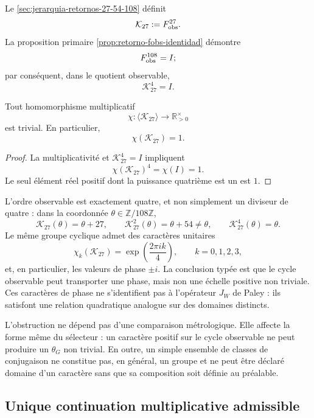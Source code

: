Le \cref{sec:jerarquia-retornos-27-54-108} définit
\[
 \mathcal K_{27}:=F_{\rm obs}^{27}.
\]
La proposition primaire \cref{prop:retorno-fobs-identidad} démontre
\[
 F_{\rm obs}^{108}=I;
\]
par conséquent, dans le quotient observable,
\[
 \mathcal K_{27}^{4}=I.
\]

\begin{theorem}
\label{thm:no-go-chi-G-observable}
Tout homomorphisme multiplicatif
\[
 \chi:\langle\mathcal K_{27}\rangle
 \longrightarrow\mathbb R_{>0}^{\times}
\]
est trivial. En particulier,
\[
 \chi(\mathcal K_{27})=1.
\]
\end{theorem}

\begin{proof}
La multiplicativité et \(\mathcal K_{27}^{4}=I\) impliquent
\[
 \chi(\mathcal K_{27})^4=\chi(I)=1.
\]
Le seul élément réel positif dont la puissance quatrième est un est \(1\).
\end{proof}

L'ordre observable est exactement quatre, et non simplement un diviseur de quatre :
dans la coordonnée \(\theta\in\mathbb Z/108\mathbb Z\),
\[
 \mathcal K_{27}(\theta)=\theta+27,
 \qquad
 \mathcal K_{27}^{2}(\theta)=\theta+54\neq\theta,
 \qquad
 \mathcal K_{27}^{4}(\theta)=\theta.
\]
Le même groupe cyclique admet des caractères unitaires
\[
 \chi_k(\mathcal K_{27})
 =\exp\!\left(\frac{2\pi i k}{4}\right),
 \qquad k=0,1,2,3,
\]
et, en particulier, les valeurs de phase \(\pm i\). La conclusion typée est
que le cycle observable peut transporter une phase, mais non une échelle positive
non triviale. Ces caractères de phase ne s'identifient pas à l'opérateur
\(J_W\) de Paley : ils satisfont une relation quadratique analogue sur des domaines
distincts.

L'obstruction ne dépend pas d'une comparaison métrologique. Elle affecte la forme
même du sélecteur : un caractère positif sur le cycle observable ne peut
produire un \(\theta_G\) non trivial. En outre, un simple ensemble de classes de
conjugaison ne constitue pas, en général, un groupe et ne peut être déclaré domaine
d'un caractère sans que sa composition soit définie au préalable.

\subsection{Unique continuation multiplicative admissible}

